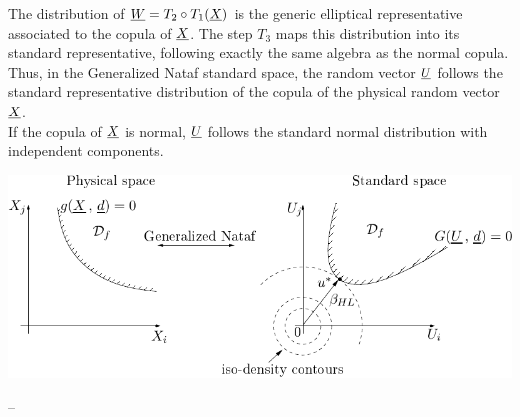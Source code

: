 {  The distribution of ${\underline{W}}=T_2\circ T_1({\underline{X}})$ is the generic elliptical representative associated to the copula of ${\underline{X}}$. The step $T_3$ maps this distribution into its standard representative, following exactly the same algebra as the normal copula. Thus, in the Generalized Nataf standard space, the random vector ${\underline{U}}$ follows the standard representative distribution of the copula of the physical random vector ${\underline{X}}$. \\
  If the copula of ${\underline{X}}$ is normal,  ${\underline{U}}$ follows the standard normal distribution with independent components.


  \begin{center}\label{genNataf}
    \includegraphics{Figures/FigureNatafGener.pdf}
  \end{center}


}
{
  --}

